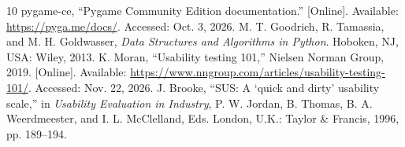 \documentclass[conference]{IEEEtran}
\begin{document}
\begin{thebibliography}{10}
 pygame-ce, ``Pygame Community Edition documentation.'' [Online]. Available: \url{https://pyga.me/docs/}. Accessed: Oct. 3, 2026.
 M. T. Goodrich, R. Tamassia, and M. H. Goldwasser, \textit{Data Structures and Algorithms in Python}. Hoboken, NJ, USA: Wiley, 2013.
 K. Moran, ``Usability testing 101,'' Nielsen Norman Group, 2019. [Online]. Available: \url{https://www.nngroup.com/articles/usability-testing-101/}. Accessed: Nov. 22, 2026.
 J. Brooke, ``SUS: A `quick and dirty' usability scale,'' in \textit{Usability Evaluation in Industry}, P. W. Jordan, B. Thomas, B. A. Weerdmeester, and I. L. McClelland, Eds. London, U.K.: Taylor \& Francis, 1996, pp. 189--194.
\end{thebibliography}
\end{document}
